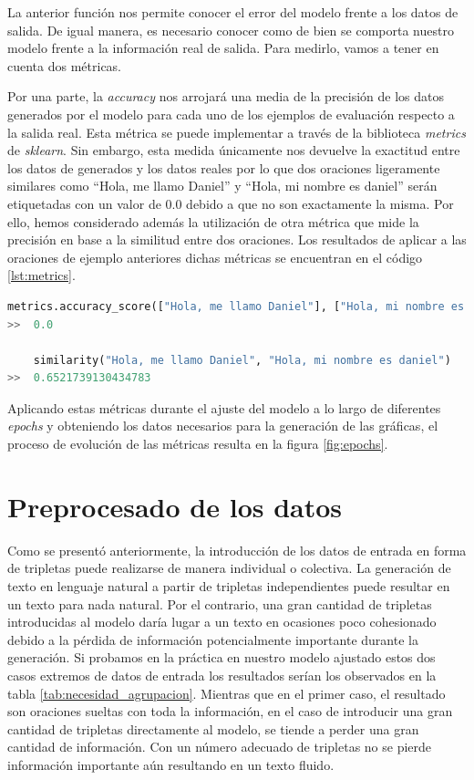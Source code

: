 La anterior función nos permite conocer el error del modelo frente a los datos de salida. De igual manera, es necesario conocer como de bien se comporta nuestro modelo frente a la información real de salida. Para medirlo, vamos a tener en cuenta dos métricas. 

Por una parte, la \textit{accuracy} nos arrojará una media de la precisión de los datos generados por el modelo para cada uno de los ejemplos de evaluación respecto a la salida real. Esta métrica se puede implementar a través de la biblioteca \textit{metrics} de \textit{sklearn}. Sin embargo, esta medida únicamente nos devuelve la exactitud entre los datos de generados y los datos reales por lo que dos oraciones ligeramente similares como ``Hola, me llamo Daniel'' y ``Hola, mi nombre es daniel'' serán etiquetadas con un valor de 0.0 debido a que no son exactamente la misma. Por ello, hemos considerado además la utilización de otra métrica que mide la precisión en base a la similitud entre dos oraciones. Los resultados de aplicar a las oraciones de ejemplo anteriores dichas métricas se encuentran en el código \ref{lst:metrics}. 


\begin{lstlisting}[language=Python, caption=Tokenizador con max\_length igual a 3, label={lst:metrics}]
    metrics.accuracy_score(["Hola, me llamo Daniel"], ["Hola, mi nombre es daniel"])
>>  0.0

    similarity("Hola, me llamo Daniel", "Hola, mi nombre es daniel")
>>  0.6521739130434783

\end{lstlisting} 

Aplicando estas métricas durante el ajuste del modelo a lo largo de diferentes \textit{epochs} y obteniendo los datos necesarios para la generación de las gráficas, el proceso de evolución de las métricas resulta en la figura \ref{fig:epochs}.

\section{Preprocesado de los datos}

Como se presentó anteriormente, la introducción de los datos de entrada en forma de tripletas puede realizarse de manera individual o colectiva. La generación de texto en lenguaje natural a partir de tripletas independientes puede resultar en un texto para nada natural. Por el contrario, una gran cantidad de tripletas introducidas al modelo daría lugar a un texto en ocasiones poco cohesionado debido a la pérdida de información potencialmente importante durante la generación. Si probamos en la práctica en nuestro modelo ajustado estos dos casos extremos de datos de entrada los resultados serían los observados en la tabla \ref{tab:necesidad_agrupacion}. Mientras que en el primer caso, el resultado son oraciones sueltas con toda la información, en el caso de introducir una gran cantidad de tripletas directamente al modelo, se tiende a perder una gran cantidad de información. Con un número adecuado de tripletas no se pierde información importante aún resultando en un texto fluido.


